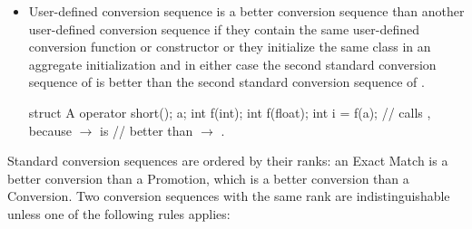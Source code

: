 \begin{itemize}
\item
User-defined conversion sequence
is a better conversion sequence than another user-defined conversion
sequence
if they contain the same user-defined conversion function or
constructor or they initialize the same class in an aggregate
initialization and in either case the second standard conversion
sequence of
is better than
the second standard conversion sequence of
.
\begin{example}
\begin{codeblock}
struct A {
  operator short();
} a;
int f(int);
int f(float);
int i = f(a);                   // calls , because  $\to$  is
                                // better than  $\to$ .
\end{codeblock}
\end{example}

\end{itemize}

\pnum
Standard conversion sequences are ordered by their ranks: an Exact Match is a
better conversion than a Promotion, which is a better conversion than
a Conversion.
Two conversion sequences with the same rank are indistinguishable unless
one of the following rules applies:

